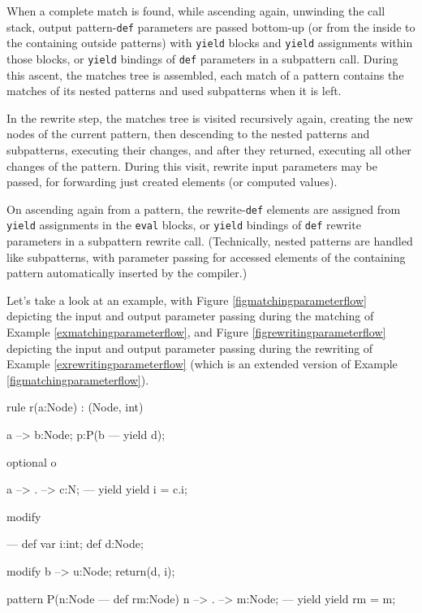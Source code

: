 When a complete match is found, while ascending again, unwinding the call stack, output pattern-\texttt{def} parameters are passed bottom-up (or from the inside to the containing outside patterns) with \texttt{yield} blocks and \texttt{yield} assignments within those blocks, or \texttt{yield} bindings of \texttt{def} parameters in a subpattern call.
During this ascent, the matches tree is assembled, each match of a pattern contains the matches of its nested patterns and used subpatterns when it is left.

In the rewrite step, the matches tree is visited recursively again, creating the new nodes of the current pattern, then descending to the nested patterns and subpatterns, executing their changes, and after they returned, executing all other changes of the pattern.
During this visit, rewrite input parameters may be passed, for forwarding just created elements (or computed values). 

On ascending again from a pattern, the rewrite-\texttt{def} elements are assigned from \texttt{yield} assignments in the \texttt{eval} blocks, or \texttt{yield} bindings of \texttt{def} rewrite parameters in a subpattern rewrite call.
(Technically, nested patterns are handled like subpatterns, with parameter passing for accessed elements of the containing pattern automatically inserted by the compiler.)

Let's take a look at an example, with Figure \ref{figmatchingparameterflow} depicting the input and output parameter passing during the matching of Example \ref{exmatchingparameterflow}, and Figure \ref{figrewritingparameterflow} depicting the input and output parameter passing during the rewriting of Example \ref{exrewritingparameterflow} (which is an extended version of Example \ref{figmatchingparameterflow}).

\begin{example}
  \begin{grgen}
rule r(a:Node) : (Node, int)
{
  a --> b:Node;
  p:P(b --- yield d);

  optional o {
    a --> . --> c:N;
  ---
    yield { yield i = c.i; }

    modify {
    }
  }
---	
  def var i:int;
  def d:Node;

  modify {
    b --> u:Node;
    return(d, i);
  }
}
pattern P(n:Node --- def rm:Node)
{
  n --> . --> m:Node;
---
  yield { yield rm = m; }
}
  \end{grgen}
\end{example}\label{exmatchingparameterflow}

